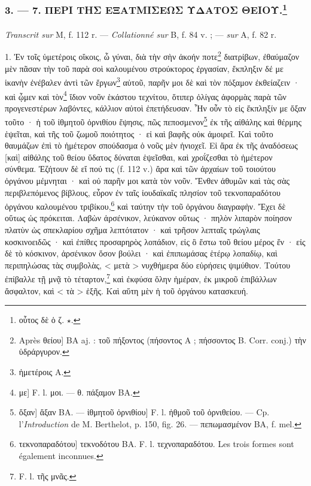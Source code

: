 \documentclass[a4paper, 11pt, oneside, polutonikogreek, french]{article}
\begin{document}
\subsubsection[3. --- 7. ΠΕΡΙ ΤΗΣ ΕΞΑΤΜΙΣΕΩΣ ΥΔΑΤΟΣ ΘΕΙΟΥ.]{3. --- 7. ΠΕΡΙ ΤΗΣ ΕΞΑΤΜΙΣΕΩΣ ΥΔΑΤΟΣ ΘΕΙΟΥ.\footnote{οὗτος δὲ ὁ ζ. $\star$.}}
\paragraph{}
\emph{Transcrit sur} M, f. 112 r. --- \emph{Collationné sur} B, f. 84 v. ; --- \emph{sur} A, f. 82 r.

\bigskip

1. Ἐν τοῖς ὑμετέροις οἴκοις, ὦ γύναι, διὰ τὴν σὴν ἀκοήν ποτε\footnote{Après θείου] BA aj. : τοῦ πήξοντος (πήσοντος A ; πήσσοντος B. Corr. conj.) τὴν ὑδράργυρον.} διατρίβων, ἐθαύμαζον μὲν πᾶσαν τὴν τοῦ παρὰ σοὶ καλουμένου στρούκτορος ἐργασίαν, ἔκπληξιν δέ με ἱκανὴν ἐνέβαλεν ἀντὶ τῶν ἔργων\footnote{ἡμετέροις A.} αὐτοῦ, παρῆν μοι δὲ καὶ τὸν πόξαμον ἐκθείαζειν · καὶ ᾦμεν καὶ τὸν\footnote{με] F. l. μοι. --- θ. πάξαμον BA.} ἴδιον νοῦν ἑκάστου τεχνίτου, ὅτιπερ ὀλίγας ἀφορμὰς παρὰ τῶν προγενεστέρων λαβόντες, κάλλιον αὐτοὶ ἐπετήδευσαν. Ἦν οὖν τὸ εἰς ἔκπληξίν με ὄξαν τοῦτο · ἡ τοῦ ἰθμητοῦ ὀρνιθίου ἕψησις, πῶς πεποσμενον\footnote{ὄξαν] ἄξαν BA. --- ἰθμητοῦ ὀρνιθίου] F. l. ἠθμοῦ τοῦ ὀρνιθείου. --- Cp. l'\emph{Introduction} de M. Berthelot, p. 150, fig. 26. --- πεπωμασμένον BA, f. mel.} ἐκ τῆς αἰθάλης καὶ θέρμης ἑψεῖται, καὶ τῆς τοῦ ζωμοῦ ποιότητος · εἰ καὶ βαφῆς οὐκ ἀμοιρεῖ. Καὶ τοῦτο θαυμάζων ἐπὶ τὸ ἡμέτερον σπούδασμα ὁ νοῦς μὲν ἡνιοχεῖ. Εἰ ἄρα ἐκ τῆς ἀναδόσεως [καὶ] αἰθάλης τοῦ θείου ὕδατος δύναται ἑψεῖσθαι, καὶ χροΐζεσθαι τὸ ἡμέτερον σύνθεμα. Ἐζήτουν δὲ εἴ πού τις (f. 112 v.) ἄρα καὶ τῶν ἀρχαίων τοῦ τοιούτου ὀργάνου μέμνηται · καὶ οὐ παρῆν μοι κατὰ τὸν νοῦν. Ἔνθεν ἀθυμῶν καὶ τὰς σὰς περιβλεπόμενος βίβλους, εὗρον ἐν ταῖς ἰουδαϊκαῖς πλησίον τοῦ τεκνοπαραδότου ὀργάνου καλουμένου τριβίκου,\footnote{τεκνοπαραδότου] τεκνοδότου BA. F. l. τεχνοπαραδότου. Les trois formes sont également inconnues.} καὶ ταύτην τὴν τοῦ ὀργάνου διαγραφὴν. Ἔχει δὲ οὕτως ὡς πρόκειται. Λαβὼν ἀρσένικον, λεύκανον οὕτως · πηλὸν λιπαρὸν ποίησον πλατὺν ὡς σπεκλαρίου σχῆμα λεπτότατον · καὶ τρῆσον λεπταῖς τρώγλαις κοσκινοειδῶς · καὶ ἐπίθες προσαρηρὸς λοπάδιον, εἰς ὃ ἔστω τοῦ θείου μέρος ἕν · εἰς δὲ τὸ κόσκινον, ἀρσένικον ὅσον βούλει · καὶ ἐπιπωμάσας ἑτέρῳ λοπαδίῳ, καὶ περιπηλώσας τὰς συμβολὰς, < μετὰ > νυχθήμερα δύο εὑρήσεις ψιμύθιον. Τούτου ἐπίβαλλε τῇ μνᾷ τὸ τέταρτον,\footnote{F. l. τῆς μνᾶς.} καὶ ἐκφύσα ὅλην ἡμέραν, ἐκ μικροῦ ἐπιβάλλων ἄσφαλτον, καὶ < τὰ > ἑξῆς. Καὶ αὕτη μὲν ἡ τοῦ ὁργάνου κατασκευή.
\end{document}
